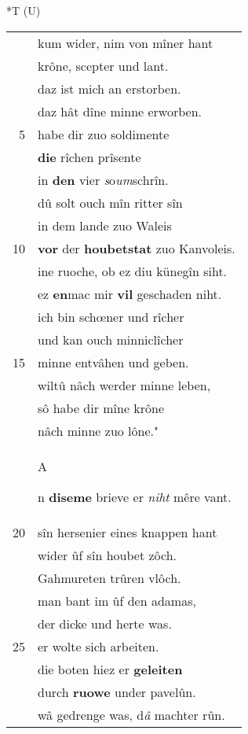 \documentclass[8pt,a4paper,notitlepage]{article}
\begin{document}
\begin{table}[ht]
\hspace{0.5cm}
\begin{minipage}[t]{0.5\linewidth}
\small
\begin{center}*T (U)
\end{center}
\begin{tabular}{rl}
 & kum wider, nim von mîner hant\\ 
 & krône, scepter und lant.\\ 
 & daz ist mich an erstorben.\\ 
 & daz hât dîne minne erworben.\\ 
5 & habe dir zuo soldimente\\ 
 & \textbf{die} rîchen prîsente\\ 
 & in \textbf{den} vier \textit{s}o\textit{um}schrîn.\\ 
 & dû solt ouch mîn ritter sîn\\ 
 & in dem lande zuo Waleis\\ 
10 & \textbf{vor} der \textbf{houbetstat} zuo Kanvoleis.\\ 
 & ine ruoche, ob ez diu künegîn siht.\\ 
 & ez \textbf{en}mac mir \textbf{vil} geschaden niht.\\ 
 & ich bin schœner und rîcher\\ 
 & und kan ouch minniclîcher\\ 
15 & minne entvâhen und geben.\\ 
 & wiltû nâch werder minne leben,\\ 
 & sô habe dir mîne krône\\ 
 & nâch minne zuo lône."\\ 
 & \begin{large}A\end{large}n \textbf{diseme} brieve er \textit{niht} mêre vant.\\ 
20 & sîn hersenier eines knappen hant\\ 
 & wider ûf sîn houbet zôch.\\ 
 & Gahmureten trûren vlôch.\\ 
 & man bant im ûf den adamas,\\ 
 & der dicke und herte was.\\ 
25 & er wolte sich arbeiten.\\ 
 & die boten hiez er \textbf{geleiten}\\ 
 & durch \textbf{ruowe} under pavelûn.\\ 
 & wâ gedrenge was, d\textit{â} machter rûn.\\ 

\end{tabular}
\end{minipage}
\end{table}
\end{document}

